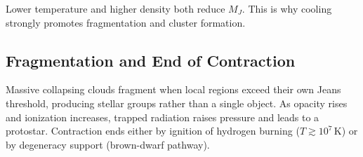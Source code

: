 \begin{importantnote}
Lower temperature and higher density both reduce $M_J$.
This is why cooling strongly promotes fragmentation and cluster formation.
\end{importantnote}

\subsection{Fragmentation and End of Contraction}
\begin{extra}
Massive collapsing clouds fragment when local regions exceed their own Jeans threshold, producing stellar groups rather than a single object.
As opacity rises and ionization increases, trapped radiation raises pressure and leads to a protostar.
Contraction ends either by ignition of hydrogen burning ($T\gtrsim 10^7\,$K) or by degeneracy support (brown-dwarf pathway).
\end{extra}
